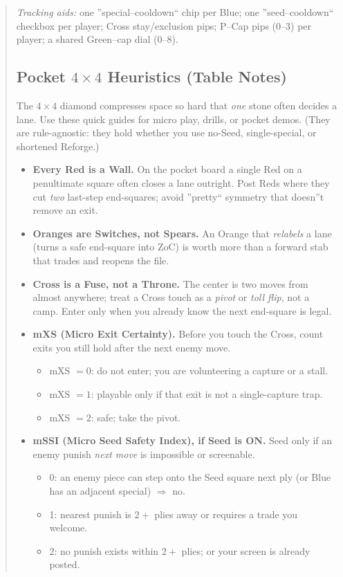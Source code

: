 \documentclass[11pt]{article}
\begin{document}
\begin{quote}
\medskip
\noindent\textit{Tracking aids:} one ''special--cooldown`` chip per Blue; one ''seed--cooldown`` checkbox per player; Cross stay/exclusion pips; P--Cap pips (0--3) per player; a shared Green--cap dial (0--8).

\subsection*{Pocket $4\times4$ Heuristics (Table Notes)}
\label{sec:pocket-4x4-heuristics}

\noindent The $4\times4$ diamond compresses space so hard that \emph{one} stone often decides a lane. Use these quick guides for micro play, drills, or pocket demos. (They are rule-agnostic: they hold whether you use no-Seed, single-special, or shortened Reforge.)

\medskip
\begin{itemize}[leftmargin=1.3em,itemsep=0.35em]

  \item \textbf{Every Red is a Wall.} On the pocket board a single Red on a penultimate square often closes a lane outright. Post Reds where they cut \emph{two} last-step end-squares; avoid ''pretty`` symmetry that doesn''t remove an exit.

  \item \textbf{Oranges are Switches, not Spears.} An Orange that \emph{relabels} a lane (turns a safe end-square into ZoC) is worth more than a forward stab that trades and reopens the file.

  \item \textbf{Cross is a Fuse, not a Throne.} The center is two moves from almost anywhere; treat a Cross touch as a \emph{pivot} or \emph{toll flip}, not a camp. Enter only when you already know the next end-square is legal.

  \item \textbf{mXS (Micro Exit Certainty).} Before you touch the Cross, count exits you still hold after the next enemy move.
  \begin{itemize}[itemsep=0.2em]
    \item mXS $=0$: do not enter; you are volunteering a capture or a stall.
    \item mXS $=1$: playable only if that exit is not a single-capture trap.
    \item mXS $=2$: safe; take the pivot.
  \end{itemize}

  \item \textbf{mSSI (Micro Seed Safety Index), if Seed is ON.} Seed only if an enemy punish \emph{next move} is impossible or screenable.
  \begin{itemize}[itemsep=0.2em]
    \item 0: an enemy piece can step onto the Seed square next ply (or Blue has an adjacent special) $\Rightarrow$ no.
    \item 1: nearest punish is $2+$ plies away or requires a trade you welcome.
    \item 2: no punish exists within $2+$ plies; or your screen is already posted.
  \end{itemize}


\end{itemize}
\end{quote}
\end{document}
